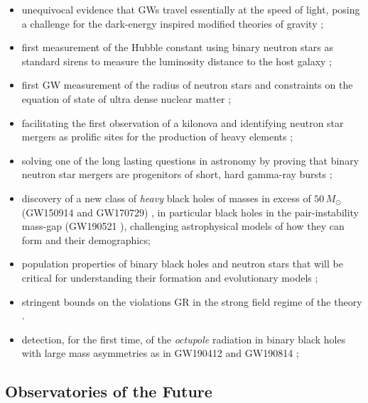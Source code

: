 \documentclass[twocolumn,aps,prd,nofootinbib,superscriptaddress,10pt,notitlepage,preprintnumbers] {revtex4-1}
\begin{document}
\begin{itemize}
\setlength\itemsep{0.2em}
    \item unequivocal evidence that GWs travel essentially at the speed of light, posing a challenge for the dark-energy inspired modified theories of gravity \cite{Monitor:2017mdv, Ezquiaga:2018btd, Sakstein:2017xjx}; %
    \item first measurement of the Hubble constant using binary neutron stars as standard sirens to measure the luminosity distance to the host galaxy \cite{Abbott:2019yzh, Hotokezaka:2018dfi};  
    \item first GW measurement of the radius of neutron stars and constraints on the equation of state of ultra dense nuclear matter \cite{Abbott:2018wiz};  
    \item facilitating the first observation of a kilonova and identifying neutron star mergers as prolific sites for the production of heavy elements \cite{GBM:2017lvd};  
    \item solving one of the long lasting questions in astronomy by proving that binary neutron star mergers are progenitors of short, hard gamma-ray bursts \cite{GW-GRB170817};
    \item  discovery of a new class of \emph{heavy} black holes of masses in excess of $50\,M_\odot$ (GW150914 and GW170729) \cite{LIGOScientific:2018mvr, Chatziioannou:2019dsz}, in particular black holes in the pair-instability mass-gap (GW190521 \cite{}),  challenging astrophysical models of how they can form and their demographics;
    \item population properties of binary black holes and neutron stars that will be critical for understanding their formation and evolutionary models \cite{LIGOScientific:2018mvr}; 
    \item stringent bounds on the violations GR in the strong field regime of the theory \cite{TheLIGOScientific:2016src, Abbott:2018lct, Yunes:2016jcc}. 
    \item detection, for the first time, of the \emph{octupole} radiation in binary black holes with large mass asymmetries as in GW190412 \cite{LIGOScientific:2020stg} and GW190814 \cite{};
\end{itemize}

\subsection*{\bf Observatories of the Future}
\end{document}
